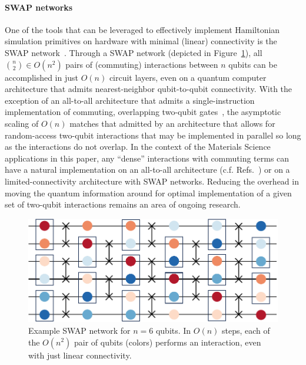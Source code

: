 \paragraph{SWAP networks} One of the tools that can be leveraged to effectively implement Hamiltonian simulation primitives on hardware with minimal (linear) connectivity is the SWAP network~\cite{kivlichan2018quantum, tomesh2021coreset,hashim2022optimized}. Through a SWAP network (depicted in Figure~\ref{fig:swap_network}), all $\binom{n}{2} \in O(n^2)$ pairs of (commuting) interactions between $n$ qubits can be accomplished in just $O(n)$ circuit layers, even on a quantum computer architecture that admits nearest-neighbor qubit-to-qubit connectivity. With the exception of an all-to-all architecture that admits a single-instruction implementation of commuting, overlapping two-qubit gates~\cite{grzesiak2020efficient,grzesiak2022efficient,bravyi2022constant}, the asymptotic scaling of $O(n)$ matches that admitted by an architecture that allows for random-access two-qubit interactions that may be implemented in parallel so long as the interactions do not overlap. In the context of the Materials Science applications in this paper, any ``dense'' interactions with commuting terms can have a natural implementation on an all-to-all architecture (c.f. Refs.~\cite{nam2019low,wang2021resource,kan2022simulating,wang2023ever}) or on a limited-connectivity architecture with SWAP networks. Reducing the overhead in moving the quantum information around for optimal implementation of a given set of two-qubit interactions remains an area of ongoing research.

\begin{figure}[htbp]
    \includegraphics[width=\linewidth]{figures/SWAPNetwork.pdf}
    \caption{Example SWAP network for $n=6$ qubits. In $O(n)$ steps, each of the $O(n^2)$ pair of qubits (colors) performs an interaction, even with just linear connectivity.}
    \label{fig:swap_network}
\end{figure}


